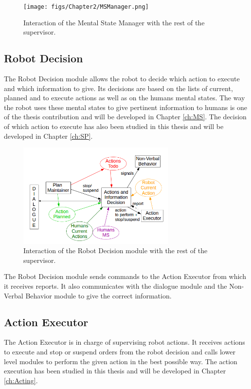 \documentclass[english,a4paper,11pt,twoside]{StyleThese}
\begin{document}
\begin{figure}[!h]
	\centering
    \texttt{[image: figs/Chapter2/MSManager.png]}
    \caption{Interaction of the Mental State Manager with the rest of the supervisor.}
    \label{fig:MSManager}
\end{figure}

\subsection{Robot Decision}

The Robot Decision module allows the robot to decide which action to execute and which information to give. Its decisions are based on the lists of current, planned and to execute actions as well as on the humans mental states. The way the robot uses these mental states to give pertinent information to humans is one of the thesis contribution and will be developed in Chapter \ref{ch:MS}. The decision of which action to execute has also been studied in this thesis and will be developed in Chapter \ref{ch:SP}.

\begin{figure}[h]
	\centering
    \includegraphics[width=0.7\textwidth]{figs/Chapter2/RobotDecision.png}
    \caption{Interaction of the Robot Decision module with the rest of the supervisor.}
    \label{fig:robotDecition}
\end{figure}

The Robot Decision module sends commands to the Action Executor from which it receives reports. It also communicates with the dialogue module and the Non-Verbal Behavior module to give the correct information.

\subsection{Action Executor}

The Action Executor is in charge of supervising robot actions. It receives actions to execute and stop or suspend orders from the robot decision and calls lower level modules to perform the given action in the best possible way. The action execution has been studied in this thesis and will be developed in Chapter \ref{ch:Acting}.
\end{document}
